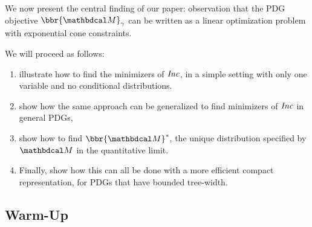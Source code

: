 \documentclass[twoside]{article}
\begin{document}
We now present the central finding of our paper:  observation that the PDG objective $\bbr{\dg M}_\gamma$ can be written
as a linear optimization problem with exponential cone constraints.

We will proceed as follows: 
\begin{enumerate}[itemsep=0pt]
    \item
    illustrate how to find the minimizers of $\mathit{Inc}$, in a simple setting with only one variable and no conditional distributions.
    \item
    show how the same approach can be generalized to find minimizers of $\mathit{Inc}$ in general PDGs,
    \item \label{item:+idef}
    show how to find $\bbr{\dg M}^*$, the unique distribution specified by $\dg M$ in the quantitative limit.
    
    \item 
    Finally, show how this can all be done
    with a more efficient compact representation, for PDGs that have
    bounded tree-width.
\end{enumerate}

\subsection{Warm-Up}\label{sec:illust}
\end{document}
